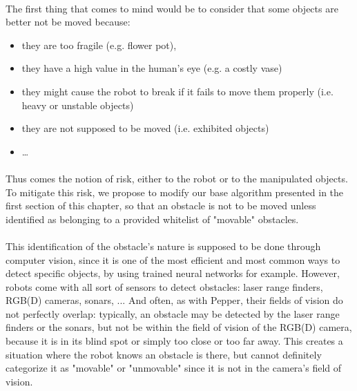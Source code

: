 \paragraph{} The first thing that comes to mind would be to consider that some objects are better not be moved because:

\begin{itemize}
  \item they are too fragile (e.g. flower pot),
  \item they have a high value in the human’s eye (e.g. a costly vase)
  \item they might cause the robot to break if it fails to move them properly (i.e. heavy or unstable objects)
  \item they are not supposed to be moved (i.e. exhibited objects)
  \item \dots
\end{itemize}

\paragraph{} Thus comes the notion of risk, either to the robot or to the manipulated objects. To mitigate this risk, we propose to modify our base algorithm presented in the first section of this chapter, so that an obstacle is not to be moved unless identified as belonging to a provided whitelist of "movable" obstacles.




\paragraph{} This identification of the obstacle's nature is supposed to be done through computer vision, since it is one of the most efficient and most common ways to detect specific objects, by using trained neural networks for example. However, robots come with all sort of sensors to detect obstacles: laser range finders, RGB(D) cameras, sonars, ... And often, as with Pepper, their fields of vision do not perfectly overlap: typically, an obstacle may be detected by the laser range finders or the sonars, but not be within the field of vision of the RGB(D) camera, because it is in its blind spot or simply too close or too far away. This creates a situation where the robot knows an obstacle is there, but cannot definitely categorize it as "movable" or "unmovable" since it is not in the camera's field of vision.

